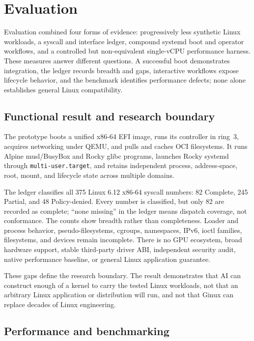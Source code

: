 \documentclass[11pt]{article}
\begin{document}
\section{Evaluation}

Evaluation combined four forms of evidence: progressively less synthetic Linux
workloads, a syscall and interface ledger, compound systemd boot and operator
workflows, and a controlled but non-equivalent single-vCPU performance harness.
These measures answer
different questions. A successful boot demonstrates integration, the ledger
records breadth and gaps, interactive workflows expose lifecycle behavior, and
the benchmark identifies performance defects; none alone establishes general
Linux compatibility.

\subsection{Functional result and research boundary}

The prototype boots a unified x86-64 EFI image, runs its controller in ring~3,
acquires networking under QEMU, and pulls and caches OCI filesystems. It runs
Alpine musl/BusyBox and Rocky glibc programs, launches Rocky systemd through
\texttt{multi-user.target}, and retains independent process, address-space,
root, mount, and lifecycle state across multiple domains.

The ledger classifies all 375 Linux 6.12 x86-64 syscall numbers: 82 Complete,
245 Partial, and 48 Policy-denied. Every number is classified, but only 82 are
recorded as complete; ``none missing'' in the ledger means dispatch coverage,
not conformance. The counts show breadth rather than completeness. Loader and
process behavior, pseudo-filesystems, cgroups,
namespaces, IPv6, ioctl families, filesystems, and devices remain incomplete.
There is no GPU ecosystem, broad hardware support, stable third-party driver
ABI, independent security audit, native performance baseline, or general Linux
application guarantee.

These gaps define the research boundary. The result demonstrates that AI can
construct enough of a kernel to carry the tested Linux workloads, not that an
arbitrary Linux application or distribution will run, and not that Ginux can
replace decades of Linux engineering.

\subsection{Performance and benchmarking}
\label{sec:performance}
\end{document}
